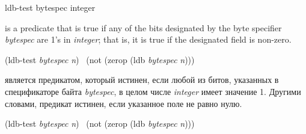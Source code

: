 \begin{defun}[Function]
ldb-test bytespec integer

 is a predicate that is true if any of
the bits designated by the byte specifier \emph{bytespec} are 1's in \emph{integer};
that is, it is true if the designated field is non-zero.
\begin{lisp}
(ldb-test \emph{bytespec} \emph{n}) \EQ\ (not (zerop (ldb \emph{bytespec} \emph{n})))
\end{lisp}

 является предикатом, который истинен, если любой из битов,
указанных в спецификаторе байта \emph{bytespec}, в целом числе \emph{integer}
имеет значение 1.
Другими словами, предикат истинен, если указанное поле не равно нулю.
\begin{lisp}
(ldb-test \emph{bytespec} \emph{n}) \EQ\ (not (zerop (ldb \emph{bytespec} \emph{n})))
\end{lisp}
\end{defun}

